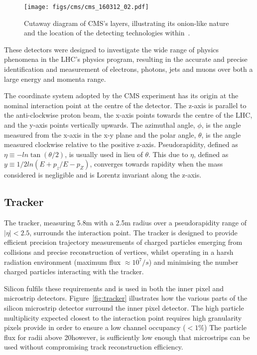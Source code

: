 \begin{figure}[htbp]
\begin{center}
\texttt{[image: figs/cms/cms\_160312\_02.pdf]}
\caption{Cutaway diagram of CMS’s layers, illustrating its onion-like nature and the location of the detecting technologies within~\cite{Sakuma:2013jqa}.}
\label{fig:cms-cutaway}
\end{center}
\end{figure}

These detectors were designed to investigate the wide range of physics phenomena in the LHC's physics program, resulting in the accurate and precise identification and measurement of electrons, photons, jets and muons over both a large energy and momenta range.

The coordinate system adopted by the CMS experiment has its origin at the nominal interaction point at the centre of the detector. 
The z-axis is parallel to the anti-clockwise proton beam, the x-axis points towards the centre of the LHC, and the y-axis points vertically upwards.
The azimuthal angle, $\phi$, is the angle measured from the x-axis in the x-y plane and the polar angle, $\theta$, is the angle measured clockwise relative to the positive z-axis.
Pseudorapidity, defined as $\eta \equiv -ln\tan(\theta/2)$, is usually used in lieu of $\theta$.
This due to $\eta$, defined as $y \equiv 1/2 ln(E+p_{z}/E-p_{Z})$, converges towards rapidity when the mass considered is negligible and is Lorentz invariant along the z-axis.

\subsection{Tracker}\label{subsec:tracker}
The tracker, measuring 5.8m with a 2.5m radius over a pseudorapidity range of $|\eta| < 2.5$, surrounds the interaction point.
The tracker is designed to provide efficient precision trajectory measurements of charged particles emerging from collisions and precise reconstruction of vertices, whilst operating in a harsh radiation environment (maximum flux $\approx 10^{7}/s$) and minimising the number charged particles interacting with the tracker.

Silicon fulfils these requirements and is used in both the inner pixel and microstrip detectors.
Figure~\ref{fig:tracker} illustrates how the various parts of the silicon microstrip detector surround the inner pixel detector.
The high particle multiplicity expected closest to the interaction point requires high granularity pixels provide in order to ensure a low channel occupancy ($< 1\%$)
The particle flux for radii above 20\cm however, is sufficiently low enough that microstrips can be used without compromising track reconstruction efficiency.

